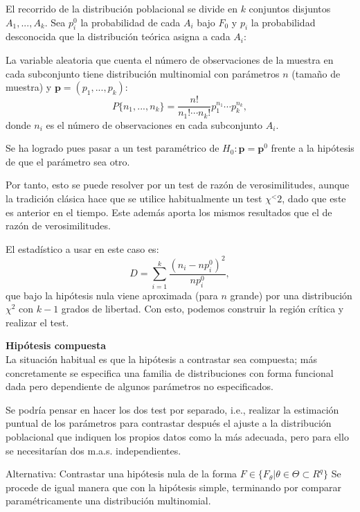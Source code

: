 \documentclass[a4paper,12pt]{article}
\begin{document}
El recorrido de la distribución poblacional se divide en $k$ conjuntos disjuntos $A_1,...,A_k$. Sea $p^0_i$ la probabilidad de cada $A_i$ bajo $F_0$ y $p_i$ la probabilidad desconocida que la distribución teórica asigna a cada $A_i$:

La variable aleatoria que cuenta el número de observaciones de la muestra en cada subconjunto tiene distribución multinomial con parámetros $n$ (tamaño de muestra) y $\textbf{p}= (p_1,...,p_k)$:
$$P\{n_1,..., n_k\}= \frac{n!}{n_1!\cdots n_k!} p^{n_1}_1\cdots p^{n_k}_k,$$
donde $n_i$ es el número de observaciones en cada subconjunto $A_i$.

Se ha logrado pues pasar a un test paramétrico de $H_0 :   \textbf{p} = \textbf{p}^0$ frente a la hipótesis de que el parámetro sea otro.

Por tanto, esto se puede resolver por un test de razón de verosimilitudes, aunque la tradición clásica hace que se utilice habitualmente un test $\chi^<2$, dado que este es anterior en el tiempo. Este además aporta los mismos resultados que el de razón de verosimilitudes.

El estadístico a usar en este caso es:
\begin{equation}
    D = \sum_{i=1}^k \frac{(n_i - n p^0_i)^2}{n p^0_i}
    ,
\end{equation}
que bajo la hipótesis nula viene aproximada (para $n$ grande) por una distribución $\chi^2$ con $k - 1$ grados de libertad.
Con esto, podemos construir la región crítica y realizar el test.


\textbf{Hipótesis compuesta} \\
La situación habitual es que la hipótesis a contrastar sea compuesta; más concretamente se especifica una familia de distribuciones con forma funcional dada pero dependiente de algunos parámetros no especificados.

Se podría pensar en hacer los dos test por separado, i.e., realizar la estimación puntual de los parámetros para contrastar después el ajuste a la distribución poblacional que indiquen los propios datos como la más adecuada, pero para ello se necesitarían dos m.a.s. independientes.

Alternativa: Contrastar una hipótesis nula de la forma $F \in \{F_\theta| \theta \in \Theta \subset R^q\}$
Se procede de igual manera que con la hipótesis simple, terminando por comparar paramétricamente una distribución multinomial.
\end{document}
